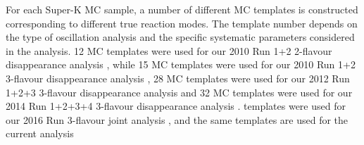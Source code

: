For each Super-K MC sample, a number of different MC templates is constructed 
corresponding to different true reaction modes.
The template number depends on the type of oscillation analysis and the specific 
systematic parameters considered in the analysis.
12 MC templates were used for our 2010 Run 1+2 2-flavour disappearance analysis \cite{OurRun12DisappAnalysis}, while
15 MC templates were used for our 2010 Run 1+2 3-flavour disappearance analysis \cite{OurRun12DisappAnalysis3Flavour},
28 MC templates were used for our 2012 Run 1+2+3 3-flavour disappearance analysis \cite{OurRun123DisappAnalysis3Flavour} and
32 MC templates were used for our 2014 Run 1+2+3+4 3-flavour disappearance analysis \cite{OurRun1234DisappAnalysis3Flavour}.
\NMCTemplate{} templates were used for our 2016 Run 3-flavour joint analysis \cite{OurRun1617b17cJointAnalysis3Flavour}, and the same templates are used for the current analysis
